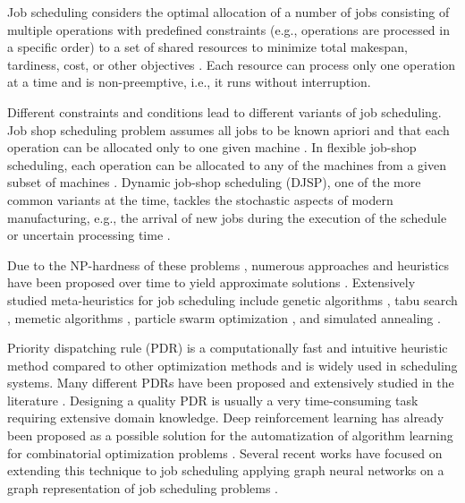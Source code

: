 

Job scheduling considers the optimal allocation of a number of jobs consisting of multiple operations with predefined constraints (e.g., operations are processed in a 
specific order) to a set of shared resources to minimize total makespan, tardiness, cost, or other objectives \cite{YamadaNakanoJSSP}. Each resource can process only one operation at a time and is non-preemptive, i.e., it runs without interruption.
\par
Different constraints and conditions lead to different variants of job scheduling. 
Job shop scheduling problem assumes all jobs to be known apriori and that each operation can be allocated only to one given machine \cite{YamadaNakanoJSSP}. In flexible job-shop scheduling, each operation can be allocated to any of the machines from a given subset of machines \cite{DAUZEREPERES2024409}. Dynamic job-shop scheduling (DJSP), one of the more common variants at the time, tackles the stochastic aspects of modern manufacturing, e.g., the arrival of new jobs during the execution of the schedule or uncertain processing time \cite{MOHAN201934}.
\par
Due to the NP-hardness of these problems \cite{Garey1976TheCO}, numerous approaches and heuristics have been proposed over time to yield approximate solutions \cite{Jansen2000ApproximationAF}. Extensively studied meta-heuristics for job scheduling include genetic algorithms \cite{PEZZELLA20083202, zhang2011effective}, tabu search \cite{Brandimarte_1993}, memetic algorithms \cite{frutos2010memetic}, particle swarm optimization \cite{ZHANG20091309}, and simulated annealing \cite{Yamada1996}.
\par
Priority dispatching rule (PDR) \cite{Haupt1989ASO} is a computationally fast and intuitive heuristic method compared to other optimization methods and is widely used in scheduling systems. Many different PDRs have been proposed and extensively studied in the literature \cite{doi:10.1080/00207543.2011.611539}. Designing a quality PDR is usually a very time-consuming task requiring extensive domain knowledge. Deep reinforcement learning has already been proposed as a possible solution for the automatization of algorithm learning for combinatorial optimization problems \cite{bengio2020machine}. Several recent works have focused on extending this technique to job scheduling \cite{zhang2020learning, https://doi.org/10.1002/tee.23788, DBLP:journals/corr/abs-2106-01086, 10114974, 9826438, 10226873} applying graph neural networks on a graph representation of job scheduling problems \cite{BLAZEWICZ2000317}.\\
